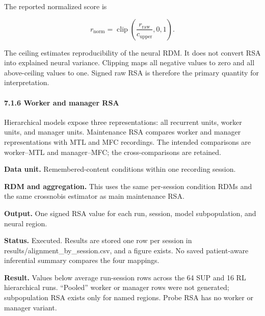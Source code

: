 \documentclass[
  10pt,
]{article}
\begin{document}
The reported normalized score is

\[
r_{\mathrm{norm}}
=
\operatorname{clip}
\left(
\frac{r_{\mathrm{raw}}}{c_{\mathrm{upper}}},
0,1
\right).
\]

The ceiling estimates reproducibility of the neural RDM. It does not
convert RSA into explained neural variance. Clipping maps all negative
values to zero and all above-ceiling values to one. Signed raw RSA is
therefore the primary quantity for interpretation.

\hypertarget{worker-and-manager-rsa}{%
\paragraph{7.1.6 Worker and manager RSA}\label{worker-and-manager-rsa}}

Hierarchical models expose three representations: all recurrent units,
worker units, and manager units. Maintenance RSA compares worker and
manager representations with MTL and MFC recordings. The intended
comparisons are worker--MTL and manager--MFC; the cross-comparisons are
retained.

\textbf{Data unit.} Remembered-content conditions within one recording
session.

\textbf{RDM and aggregation.} This uses the same per-session condition
RDMs and the same crossnobis estimator as main maintenance RSA.

\textbf{Output.} One signed RSA value for each run, session, model
subpopulation, and neural region.

\textbf{Status.} Executed. Results are stored one row per session in
results/alignment\_by\_session.csv, and a figure exists. No saved
patient-aware inferential summary compares the four mappings.

\textbf{Result.} Values below average run-session rows across the 64 SUP
and 16 RL hierarchical runs. ``Pooled'' worker or manager rows were not
generated; subpopulation RSA exists only for named regions. Probe RSA
has no worker or manager variant.
\end{document}
